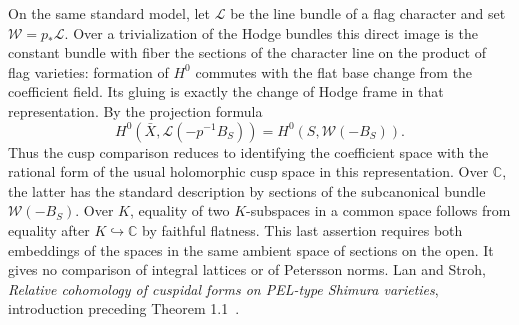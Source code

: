 On the same standard model, let \(\mathcal L\) be the line bundle of
a flag character and set \(\mathcal W=p_*\mathcal L\). Over a
trivialization of the Hodge bundles this direct image is the constant
bundle with fiber the sections of the character line on the product
of flag varieties: formation of \(H^0\) commutes with the flat base
change from the coefficient field. Its gluing is exactly the change
of Hodge frame in that representation. By the projection formula
\[
 H^0(\bar X,\mathcal L(-p^{-1}B_S))
       = H^0(S,\mathcal W(-B_S)).
\]
Thus the cusp comparison reduces to identifying the coefficient
space with the rational form of the usual holomorphic cusp space in
this representation. Over \(\mathbb C\), the latter has the standard
description by sections of the subcanonical bundle
\(\mathcal W(-B_S)\). Over \(K\), equality of two \(K\)-subspaces
in a common space follows from equality after \(K\hookrightarrow\mathbb C\)
by faithful flatness. This last assertion requires both embeddings
of the spaces in the same ambient space of sections on the open.
It gives no comparison of integral lattices or of Petersson norms.
Lan and Stroh,
\emph{Relative cohomology of cuspidal forms on PEL-type Shimura varieties},
introduction preceding Theorem 1.1~\cite{lanStroh}.

